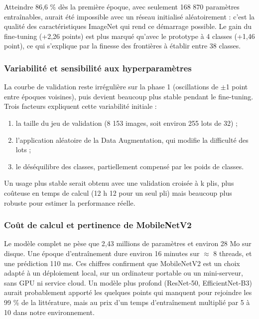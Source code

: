 \documentclass[10pt,a4paper]{article}
\begin{document}
Atteindre 86,6 \% dès la première époque, avec seulement 168 870 paramètres entraînables, aurait été impossible avec un réseau initialisé aléatoirement : c'est la qualité des caractéristiques ImageNet qui rend ce démarrage possible. Le gain du fine-tuning (+2,26 points) est plus marqué qu'avec le prototype à 4 classes (+1,46 point), ce qui s'explique par la finesse des frontières à établir entre 38 classes.

\subsubsection{Variabilité et sensibilité aux hyperparamètres}

La courbe de validation reste irrégulière sur la phase 1 (oscillations de $\pm$1 point entre époques voisines), puis devient beaucoup plus stable pendant le fine-tuning. Trois facteurs expliquent cette variabilité initiale :

\begin{enumerate}
\item la taille du jeu de validation (8 153 images, soit environ 255 lots de 32) ;
\item l'application aléatoire de la Data Augmentation, qui modifie la difficulté des lots ;
\item le déséquilibre des classes, partiellement compensé par les poids de classes.
\end{enumerate}

Un usage plus stable serait obtenu avec une validation croisée à k plis, plus coûteuse en temps de calcul (12 h 12 pour un seul pli) mais beaucoup plus robuste pour estimer la performance réelle.

\subsubsection{Coût de calcul et pertinence de MobileNetV2}

Le modèle complet ne pèse que 2,43 millions de paramètres et environ 28 Mo sur disque. Une époque d'entraînement dure environ 16 minutes sur $\approx$ 8 threads, et une prédiction 110 ms. Ces chiffres confirment que MobileNetV2 est un choix adapté à un déploiement local, sur un ordinateur portable ou un mini-serveur, sans GPU ni service cloud. Un modèle plus profond (ResNet-50, EfficientNet-B3) aurait probablement apporté les quelques points qui manquent pour rejoindre les 99 \% de la littérature, mais au prix d'un temps d'entraînement multiplié par 5 à 10 dans notre environnement.
\end{document}
